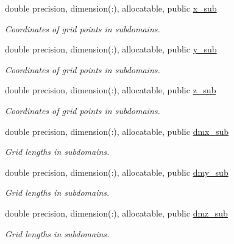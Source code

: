 \textbf{ }\par
\begin{DoxyCompactItemize}
\item 
double precision, dimension(\+:), allocatable, public \mbox{\hyperlink{namespacempi__subdomain_a978554e1520c79471ef3793ed1872b37}{x\+\_\+sub}}
\begin{DoxyCompactList}\small\item\em Coordinates of grid points in subdomains. \end{DoxyCompactList}\item 
double precision, dimension(\+:), allocatable, public \mbox{\hyperlink{namespacempi__subdomain_a58b09abee5f1002de7b20b1b86f5c821}{y\+\_\+sub}}
\begin{DoxyCompactList}\small\item\em Coordinates of grid points in subdomains. \end{DoxyCompactList}\item 
double precision, dimension(\+:), allocatable, public \mbox{\hyperlink{namespacempi__subdomain_aab6d78e49471a9a3db5ad9df4c3d4041}{z\+\_\+sub}}
\begin{DoxyCompactList}\small\item\em Coordinates of grid points in subdomains. \end{DoxyCompactList}\end{DoxyCompactItemize}

\textbf{ }\par
\begin{DoxyCompactItemize}
\item 
double precision, dimension(\+:), allocatable, public \mbox{\hyperlink{namespacempi__subdomain_a56af1740899dc9df6868e5e71a0884a5}{dmx\+\_\+sub}}
\begin{DoxyCompactList}\small\item\em Grid lengths in subdomains. \end{DoxyCompactList}\item 
double precision, dimension(\+:), allocatable, public \mbox{\hyperlink{namespacempi__subdomain_ae44efbff9669bfad03a79ab41b5e8ace}{dmy\+\_\+sub}}
\begin{DoxyCompactList}\small\item\em Grid lengths in subdomains. \end{DoxyCompactList}\item 
double precision, dimension(\+:), allocatable, public \mbox{\hyperlink{namespacempi__subdomain_afb6341d7362587d6fd0a06fe78ba4e3f}{dmz\+\_\+sub}}
\begin{DoxyCompactList}\small\item\em Grid lengths in subdomains. \end{DoxyCompactList}\end{DoxyCompactItemize}

